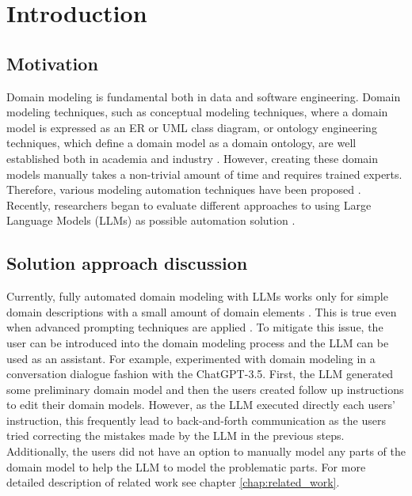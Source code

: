 \chapter*{Introduction}


\section*{Motivation}

Domain modeling is fundamental both in data and software engineering. Domain modeling techniques, such as conceptual modeling techniques, where a domain model is expressed as an ER or UML class diagram, or ontology engineering techniques, which define a domain model as a domain ontology, are well established both in academia and industry \cite{Verdonck2018}. However, creating these domain models manually takes a non-trivial amount of time and requires trained experts. Therefore, various modeling automation techniques have been proposed \cite{Sonbol2022}. Recently, researchers began to evaluate different approaches to using Large Language Models (LLMs) as possible automation solution \cite{Chen2023,Saeedizade2024}.


\section*{Solution approach discussion}

Currently, fully automated domain modeling with LLMs works only for simple domain descriptions with a small amount of domain elements \cite{Camara2023}. This is true even when advanced prompting techniques are applied \cite{Chen2023,Saeedizade2024}. To mitigate this issue, the user can be introduced into the domain modeling process \cite{Camara2023} and the LLM can be used as an assistant. For example, \citet{Camara2023} experimented with domain modeling in a conversation dialogue fashion with the ChatGPT-3.5. First, the LLM generated some preliminary domain model and then the users created follow up instructions to edit their domain models. However, as the LLM executed directly each users' instruction, this frequently lead to back-and-forth communication as the users tried correcting the mistakes made by the LLM in the previous steps. Additionally, the users did not have an option to manually model any parts of the domain model to help the LLM to model the problematic parts. For more detailed description of related work see chapter \ref{chap:related_work}.


